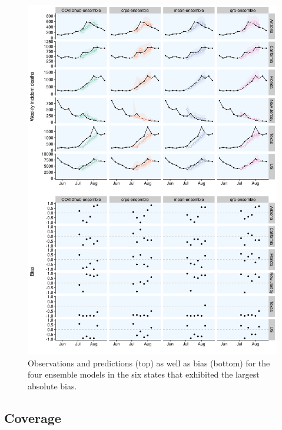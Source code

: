 \documentclass[
]{book}
\begin{document}
\begin{figure}
\includegraphics[width=1\linewidth]{../visualisation/chapter-5-results/scenario-baseline/bias_ensemble} \caption{Observations and predictions (top) as well as bias (bottom) for the four ensemble models in the six states that exhibited the largest absolute bias.}\label{fig:bias-ensemble}
\end{figure}

\hypertarget{coverage}{%
\subsection{Coverage}\label{coverage}}
\end{document}
